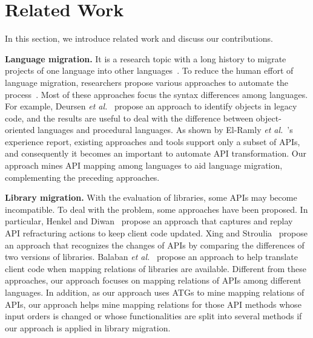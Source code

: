 \section{Related Work}
\label{sec:related} In this section, we introduce related work and
discuss our contributions.

\textbf{Language migration.} It is a research topic with a long
history to migrate projects of one language into other
languages~\cite{samet1981experience}. To reduce the human effort of
language migration, researchers propose various approaches to
automate the
process~\cite{van1999identifying,waters1988program,mossienko2003automated,yasumatsu1995spice,hainaut2008migration}.
Most of these approaches focus the syntax differences among
languages. For example, Deursen \emph{et
al.}~\cite{van1999identifying} propose an approach to identify
objects in legacy code, and the results are useful to deal with the
difference  between object-oriented languages and procedural
languages. As shown by El-Ramly \emph{et
al.}~\cite{el2006experiment}'s experience report, existing
approaches and tools support only a subset of APIs, and consequently
it becomes an important to automate API transformation. Our approach
mines API mapping among languages to aid language migration,
complementing the preceding approaches.

\textbf{Library migration.} With the evaluation of libraries, some
APIs may become incompatible. To deal with the problem, some
approaches have been proposed. In particular, Henkel and
Diwan~\cite{henkel2005catchup} propose an approach that captures and
replay API refracturing actions to keep client code updated. Xing
and Stroulia~\cite{xing2007api} propose an approach that recognizes
the changes of APIs by comparing the differences of two versions of
libraries. Balaban \emph{et al.}~\cite{balaban2005refactoring}
propose an approach to help translate client code when mapping
relations of libraries are available. Different from these
approaches, our approach focuses on mapping relations of APIs among
different languages. In addition, as our approach uses ATGs to mine
mapping relations of APIs, our approach helps mine mapping relations
for those API methods whose input orders is changed or whose
functionalities are split into several methods if our approach is
applied in library migration.
